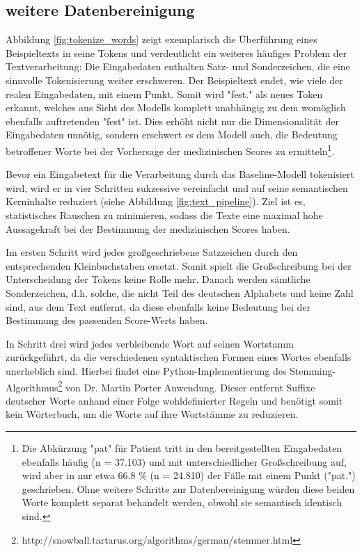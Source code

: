 \subsection{weitere Datenbereinigung}
Abbildung \ref{fig:tokenize_words} zeigt exemplarisch die Überführung eines Beispieltexts in seine Tokens und verdeutlicht ein weiteres häufiges Problem der Textverarbeitung: Die Eingabedaten enthalten Satz- und Sonderzeichen, die eine sinnvolle Tokenisierung weiter erschweren. Der Beispieltext endet, wie viele der realen Eingabedaten, mit einem Punkt. Somit wird "fest." als neues Token erkannt, welches aus Sicht des Modells komplett unabhängig zu dem womöglich ebenfalls auftretenden "fest" ist. Dies erhöht nicht nur die Dimensionalität der Eingabedaten unnötig, sondern erschwert es dem Modell auch, die Bedeutung betroffener Worte bei der Vorhersage der medizinischen Scores zu ermitteln\footnote{Die Abkürzung "pat" für Patient tritt in den bereitgestellten Eingabedaten ebenfalls häufig (n = 37.103) und mit unterschiedlicher Großschreibung auf, wird aber in nur etwa 66.8 \% (n = 24.810) der Fälle mit einem Punkt ("pat.") geschrieben. Ohne weitere Schritte zur Datenbereinigung würden diese beiden Worte komplett separat behandelt werden, obwohl sie semantisch identisch sind.}.

Bevor ein Eingabetext für die Verarbeitung durch das Baseline-Modell tokenisiert wird, wird er in vier Schritten sukzessive vereinfacht und auf seine semantischen Kerninhalte reduziert (siehe Abbildung \ref{fig:text_pipeline}). Ziel ist es, statistisches Rauschen zu minimieren, sodass die Texte eine maximal hohe Aussagekraft bei der Bestimmung der medizinischen Scores haben.

Im ersten Schritt wird jedes großgeschriebene Satzzeichen durch den entsprechenden Kleinbuchstaben ersetzt. Somit spielt die Großschreibung bei der Unterscheidung der Tokens keine Rolle mehr. 
Danach werden sämtliche Sonderzeichen, d.h. solche, die nicht Teil des deutschen Alphabets und keine Zahl sind, aus dem Text entfernt, da diese ebenfalls keine Bedeutung bei der Bestimmung des passenden Score-Werts haben.

In Schritt drei wird jedes verbleibende Wort auf seinen Wortstamm zurückgeführt, da die verschiedenen syntaktischen Formen eines Wortes ebenfalls unerheblich sind. Hierbei findet eine Python-Implementierung des Stemming-Algorithmus\footnote{http://snowball.tartarus.org/algorithms/german/stemmer.html} von Dr. Martin Porter Anwendung. Dieser entfernt Suffixe deutscher Worte anhand einer Folge wohldefinierter Regeln und benötigt somit kein Wörterbuch, um die Worte auf ihre Wortstämme zu reduzieren.

